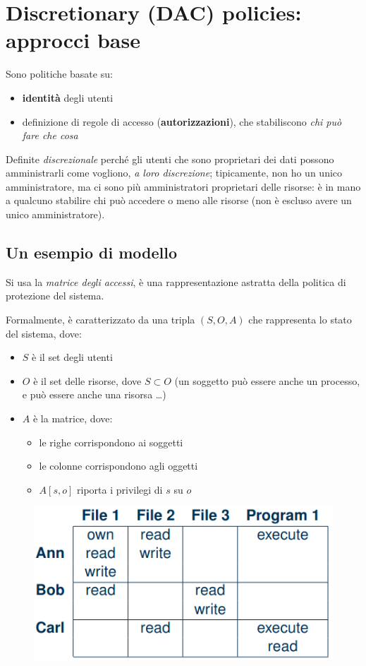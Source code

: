 \documentclass{report}
\begin{document}
\chapter{Discretionary (DAC) policies: approcci base}

\noindent Sono politiche basate su:
\begin{itemize}
    \item \textbf{identità} degli utenti 
    \item definizione di regole di accesso (\textbf{autorizzazioni}), che stabiliscono
    \textit{chi può fare che cosa}
\end{itemize}

\noindent Definite \textit{discrezionale} perché gli utenti che sono proprietari 
dei dati possono amministrarli come vogliono, \textit{a loro discrezione}; tipicamente, 
non ho un unico amministratore, ma ci sono più amministratori proprietari delle risorse: è 
in mano a qualcuno stabilire chi può accedere o meno alle risorse (non è escluso avere 
un unico amministratore).

\section{Un esempio di modello}
Si usa la \textit{matrice degli accessi}, è una rappresentazione astratta della 
politica di protezione del sistema.

\noindent Formalmente, è caratterizzato da una tripla $(S, O, A)$ che rappresenta 
lo stato del sistema, dove:
\begin{itemize}
    \item $S$ è il set degli utenti 
    \item $O$ è il set delle risorse, dove $S \subset O$ (un soggetto può essere anche un processo, e può 
    essere anche una risorsa \dots)
    \item $A$ è la matrice, dove:
    \begin{itemize}
        \item le righe corrispondono ai soggetti 
        \item le colonne corrispondono agli oggetti 
        \item $A[s, o]$ riporta i privilegi di $s$ su $o$
    \end{itemize}
\end{itemize}

\begin{figure}[H]
    \centering
    \includegraphics[width=0.6\linewidth]{images/dac1.png}
\end{figure}
\end{document}
